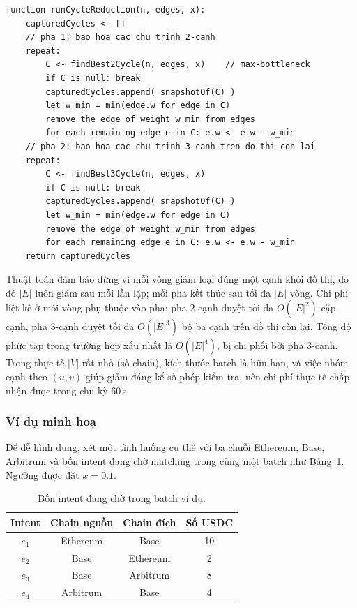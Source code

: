 \begin{verbatim}
function runCycleReduction(n, edges, x):
    capturedCycles <- []
    // pha 1: bao hoa cac chu trinh 2-canh
    repeat:
        C <- findBest2Cycle(n, edges, x)    // max-bottleneck
        if C is null: break
        capturedCycles.append( snapshotOf(C) )
        let w_min = min(edge.w for edge in C)
        remove the edge of weight w_min from edges
        for each remaining edge e in C: e.w <- e.w - w_min
    // pha 2: bao hoa cac chu trinh 3-canh tren do thi con lai
    repeat:
        C <- findBest3Cycle(n, edges, x)
        if C is null: break
        capturedCycles.append( snapshotOf(C) )
        let w_min = min(edge.w for edge in C)
        remove the edge of weight w_min from edges
        for each remaining edge e in C: e.w <- e.w - w_min
    return capturedCycles
\end{verbatim}

Thuật toán đảm bảo dừng vì mỗi vòng giảm loại đúng một cạnh khỏi đồ thị, do đó
$|E|$ luôn giảm sau mỗi lần lặp; mỗi pha kết thúc sau tối đa $|E|$ vòng. Chi
phí liệt kê ở mỗi vòng phụ thuộc vào pha: pha 2-cạnh duyệt tối đa $O(|E|^2)$
cặp cạnh, pha 3-cạnh duyệt tối đa $O(|E|^3)$ bộ ba cạnh trên đồ thị còn lại.
Tổng độ phức tạp trong trường hợp xấu nhất là $O(|E|^4)$, bị chi phối bởi pha
3-cạnh. Trong thực tế $|V|$ rất nhỏ (số chain), kích thước batch là hữu hạn, và
việc nhóm cạnh theo $(u, v)$ giúp giảm đáng kể số phép kiểm tra, nên chi phí
thực tế chấp nhận được trong chu kỳ 60\,s.

\subsubsection{Ví dụ minh hoạ}

Để dễ hình dung, xét một tình huống cụ thể với ba chuỗi Ethereum, Base, Arbitrum
và bốn intent đang chờ matching trong cùng một batch như Bảng~\ref{tab:matching-example-input}.
Ngưỡng được đặt $x = 0.1$.

\begin{table}[H]
    \centering
    \caption{Bốn intent đang chờ trong batch ví dụ.}
    \label{tab:matching-example-input}
    \begin{tabular}{|c|c|c|c|}
        \hline
        \textbf{Intent} & \textbf{Chain nguồn} & \textbf{Chain đích} & \textbf{Số USDC} \\
        \hline
        $e_1$ & Ethereum & Base & 10 \\
        \hline
        $e_2$ & Base & Ethereum & 2 \\
        \hline
        $e_3$ & Base & Arbitrum & 8 \\
        \hline
        $e_4$ & Arbitrum & Base & 4 \\
        \hline
    \end{tabular}
\end{table}


